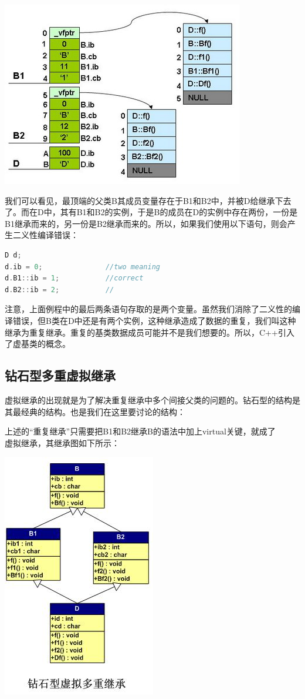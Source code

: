 \documentclass{article}
\begin{document}
\begin{CJK}{UTF8}{gbsn}
\includegraphics{dmi.jpg}

我们可以看见，最顶端的父类B其成员变量存在于B1和B2中，并被D给继承下去了。而在D中，其有B1和B2的实例，于是B的成员在D的实例中存在两份，一份是B1继承而来的，另一份是B2继承而来的。所以，如果我们使用以下语句，则会产生二义性编译错误：
\begin{lstlisting}[language=c++]
D d;
d.ib = 0;               //two meaning
d.B1::ib = 1;           //correct
d.B2::ib = 2;           //
\end{lstlisting}
注意，上面例程中的最后两条语句存取的是两个变量。虽然我们消除了二义性的编译错误，但B类在D中还是有两个实例，这种继承造成了数据的重复，我们叫这种继承为重复继承。重复的基类数据成员可能并不是我们想要的。所以，C++引入了虚基类的概念。

\subsection{钻石型多重虚拟继承}
虚拟继承的出现就是为了解决重复继承中多个间接父类的问题的。钻石型的结构是其最经典的结构。也是我们在这里要讨论的结构：
 
上述的“重复继承”只需要把B1和B2继承B的语法中加上virtual关键，就成了\\
虚拟继承，其继承图如下所示：

\includegraphics{mi2.jpg}


\end{CJK}
\end{document}
